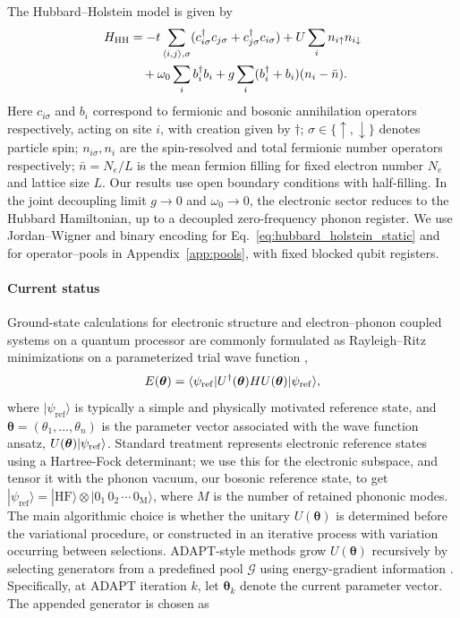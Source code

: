 \documentclass[
  reprint,
  amsmath,
  amssymb,
  aps,
  pra,
  nofootinbib,
  superscriptaddress,
  floatfix
]{revtex4-2}
\newcommand{\ket}[1]{|#1\rangle}
\newcommand{\bra}[1]{\langle #1|}
\begin{document}
The Hubbard--Holstein model is given by
\begin{align}
H_{\rm HH}
&=-t\sum_{\langle i,j\rangle,\sigma}
(c_{i\sigma}^{\dagger}c_{j\sigma}+c_{j\sigma}^{\dagger}c_{i\sigma})
+U\sum_i n_{i\uparrow}n_{i\downarrow}
\nonumber\\
&\quad+\omega_0\sum_i b_i^\dagger b_i
+g\sum_i(b_i^\dagger+b_i)(n_i-\bar n).
\label{eq:hubbard_holstein_static}
\end{align}
Here \(c_{i\sigma}\) and \(b_i\) correspond to fermionic and bosonic annihilation operators respectively, acting on site $i$, with creation given by $\dagger$; $\sigma \in\{\uparrow, \downarrow\}$ denotes particle spin;
\(n_{i\sigma}, n_i\) are the spin-resolved and total fermionic number operators respectively; \(\bar n=N_e/L\) is the mean fermion filling
for fixed electron number \(N_e\) and lattice size \(L\). Our results use open boundary conditions with half-filling.
In the joint decoupling limit $g\to0$ and $\omega_0\to0$, the electronic sector reduces to the Hubbard Hamiltonian, up to a decoupled zero-frequency phonon register. We use Jordan--Wigner and binary encoding for Eq.~\eqref{eq:hubbard_holstein_static} and for operator--pools in Appendix~\ref{app:pools}, with fixed blocked qubit registers.


\paragraph*{Current status}
Ground-state calculations for electronic structure and electron--phonon coupled systems on a quantum processor are commonly formulated as Rayleigh--Ritz minimizations on a parameterized trial wave function \cite{Peruzzo2014,McClean2016,Kandala2017},
\begin{equation}
E(\boldsymbol{\theta})=
\bra{\psi_{\rm ref}}U^\dagger(\boldsymbol{\theta})HU(\boldsymbol{\theta})\ket{\psi_{\rm ref}},
\label{eq:rayleigh_static}
\end{equation}
where \(\ket{\psi_{\mathrm{ref}}}\) is typically a simple and physically motivated reference state, and $\boldsymbol{\theta}=(\theta_1,\ldots,\theta_n)$ is the parameter vector associated with the wave function ansatz, $U(\boldsymbol{\theta})\ket{\psi_{\rm ref}}$. Standard treatment represents electronic reference states using a Hartree-Fock determinant; we use this for the electronic subspace, and tensor it with the phonon vacuum, our bosonic reference state, to get \(\ket{\psi_{\mathrm{ref}}}=\ket{\mathrm{HF}}\otimes\ket{0_1\,0_2\,\cdots\,0_{\mathrm{M}}}\), where \(M\) is the number of retained phononic modes. The main algorithmic choice is whether the unitary \(U(\boldsymbol{\theta})\) is determined before the variational procedure, or constructed in an iterative process with variation occurring between selections. ADAPT-style methods grow \(U(\boldsymbol{\theta})\) recursively by selecting generators from a predefined pool \(\mathcal{G}\) using energy-gradient information \cite{Grimsley2019,Tang2021,Yordanov2021}. Specifically, at ADAPT iteration \(k\), let \(\boldsymbol{\theta}_k\) denote the current parameter vector. The appended generator is chosen as
\end{document}
